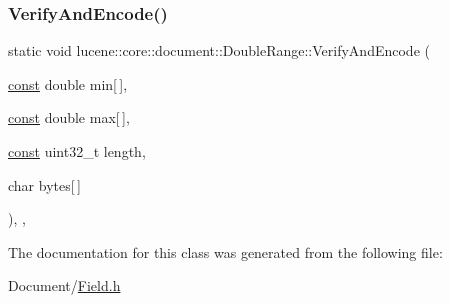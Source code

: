 \subsubsection{\texorpdfstring{Verify\+And\+Encode()}{VerifyAndEncode()}}
{\footnotesize\ttfamily static void lucene\+::core\+::document\+::\+Double\+Range\+::\+Verify\+And\+Encode (\begin{DoxyParamCaption}\item[{\mbox{\hyperlink{ZlibCrc32_8h_a2c212835823e3c54a8ab6d95c652660e}{const}} double}]{min\mbox{[}$\,$\mbox{]},  }\item[{\mbox{\hyperlink{ZlibCrc32_8h_a2c212835823e3c54a8ab6d95c652660e}{const}} double}]{max\mbox{[}$\,$\mbox{]},  }\item[{\mbox{\hyperlink{ZlibCrc32_8h_a2c212835823e3c54a8ab6d95c652660e}{const}} uint32\+\_\+t}]{length,  }\item[{char}]{bytes\mbox{[}$\,$\mbox{]} }\end{DoxyParamCaption})\hspace{0.3cm}{\ttfamily [inline]}, {\ttfamily [static]}, {\ttfamily [private]}}



The documentation for this class was generated from the following file\+:\begin{DoxyCompactItemize}
\item 
Document/\mbox{\hyperlink{Document_2Field_8h}{Field.\+h}}\end{DoxyCompactItemize}
